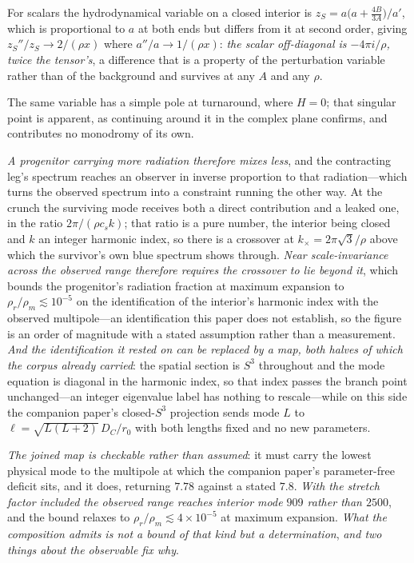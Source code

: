 \documentclass[11pt,a4paper]{article}
\theoremstyle{plain}
\theoremstyle{definition}
\theoremstyle{remark}
\begin{document}
For scalars the hydrodynamical variable on a closed interior is $z_S=a\bigl(a+\tfrac{4B}{3A}\bigr)/a'$, which is proportional to $a$ at both ends but differs from it at second order, giving $z_S''/z_S\to2/(\rho x)$ where $a''/a\to1/(\rho x)$: \emph{the scalar off-diagonal is $-4\pi i/\rho$, twice the tensor's}, a difference that is a property of the perturbation variable rather than of the background and survives at any $A$ and any $\rho$. 

The same variable has a simple pole at turnaround, where $H=0$; that singular point is apparent, as continuing around it in the complex plane confirms, and contributes no monodromy of its own. 

\emph{A progenitor carrying more radiation therefore mixes less}, and the contracting leg's spectrum reaches an observer in inverse proportion to that radiation---which turns the observed spectrum into a constraint running the other way. At the crunch the surviving mode receives both a direct contribution and a leaked one, in the ratio $2\pi/(\rho c_sk)$; that ratio is a pure number, the interior being closed and $k$ an integer harmonic index, so there is a crossover at $k_{\times}=2\pi\sqrt3/\rho$ above which the survivor's own blue spectrum shows through. \emph{Near scale-invariance across the observed range therefore requires the crossover to lie beyond it}, which bounds the progenitor's radiation fraction at maximum expansion to $\rho_r/\rho_m\lesssim10^{-5}$ on the identification of the interior's harmonic index with the observed multipole---an identification this paper does not establish, so the figure is an order of magnitude with a stated assumption rather than a measurement. \emph{And the identification it rested on can be replaced by a map, both halves of which the corpus already carried}: the spatial section is $S^{3}$ throughout and the mode equation is diagonal in the harmonic index, so that index passes the branch point unchanged---an integer eigenvalue label has nothing to rescale---while on this side the companion paper's closed-$S^{3}$ projection sends mode $L$ to $\ell=\sqrt{L(L+2)}\,D_C/r_0$ with both lengths fixed and no new parameters. 

\emph{The joined map is checkable rather than assumed}: it must carry the lowest physical mode to the multipole at which the companion paper's parameter-free deficit sits, and it does, returning $7.78$ against a stated $7.8$. \emph{With the stretch factor included the observed range reaches interior mode $909$ rather than $2500$}, and the bound relaxes to $\rho_r/\rho_m\lesssim4\times10^{-5}$ at maximum expansion. \emph{What the composition admits is not a bound of that kind but a determination}, \emph{and two things about the observable fix why}. 
\end{document}
